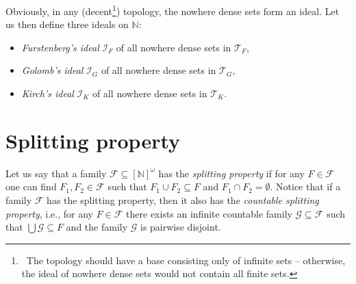 \documentclass{amsart}
\theoremstyle{definition}
\newcommand{\N}{{\mathbb N}}
\newcommand{\I}{\mathcal I}
\newcommand{\T}{\mathcal{T}}
\newcommand{\InfSubs}{[\N]^{\omega}}
\begin{document}
Obviously, in any (decent\footnote{\ The topology should have a base consisting only of infinite sets -- otherwise, the ideal of nowhere dense sets would not contain all finite sets.}) topology, the nowhere dense sets form an ideal. Let us then define three ideals on $\N$:
\begin{itemize}
\item \emph{Furstenberg's ideal} $\I_F$ of all nowhere dense sets in $\T_F$,
\item \emph{Golomb's ideal} $\I_G$ of all nowhere dense sets in $\T_G$,
\item \emph{Kirch's ideal} $\I_K$ of all nowhere dense sets in $\T_K$.
\end{itemize}


\section*{Splitting property}

Let us say that a family $\mathcal{F} \subseteq \InfSubs$ has the \emph{splitting property} if for any $F \in \mathcal{F}$ one can find $F_1, F_2 \in \mathcal{F}$ such that $F_1 \cup F_2 \subseteq F$ and $F_1 \cap F_2 = \emptyset$. Notice that if a family $\mathcal{F}$ has the splitting property, then it also has the \emph{countable splitting property}, i.e., for any $F \in \mathcal{F}$ there exists an infinite countable family $\mathcal{G} \subseteq \mathcal{F}$ such that $\bigcup{\mathcal{G}} \subseteq F$ and the family $\mathcal{G}$ is pairwise disjoint.
\end{document}
